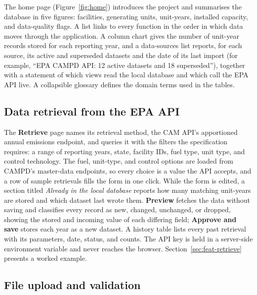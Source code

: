 \documentclass[11pt,a4paper]{article}
\begin{document}
The home page (Figure~\ref{fig:home}) introduces the project and summarises the database in
five figures: facilities, generating units, unit-years, installed capacity, and data-quality
flags. A list links to every function in the order in which data moves through the
application. A column chart gives the number of unit-year records stored for each reporting
year, and a data-sources list reports, for each source, its active and superseded datasets and
the date of its last import (for example, ``EPA CAMPD API: 12 active datasets and 18
superseded''), together with a statement of which views read the local database and which call
the EPA API live. A collapsible glossary defines the domain terms used in the tables.

\subsection{Data retrieval from the EPA API}

The \textbf{Retrieve} page names its retrieval method, the CAM API's apportioned annual
emissions endpoint, and queries it with the filters the specification requires: a range of
reporting years, state, facility IDs, fuel type, unit type, and control technology. The fuel,
unit-type, and control options are loaded from CAMPD's master-data endpoints, so every choice is
a value the API accepts, and a row of sample retrievals fills the form in one click. While the
form is edited, a section titled \emph{Already in the local database} reports how many matching
unit-years are stored and which dataset last wrote them. \textbf{Preview} fetches the data
without saving and classifies every record as new, changed, unchanged, or dropped, showing the
stored and incoming value of each differing field; \textbf{Approve and save} stores each year as
a new dataset. A history table lists every past retrieval with its parameters, date, status,
and counts. The API key is held in a server-side environment variable and never reaches the
browser. Section~\ref{sec:feat-retrieve} presents a worked example.

\subsection{File upload and validation}
\end{document}

